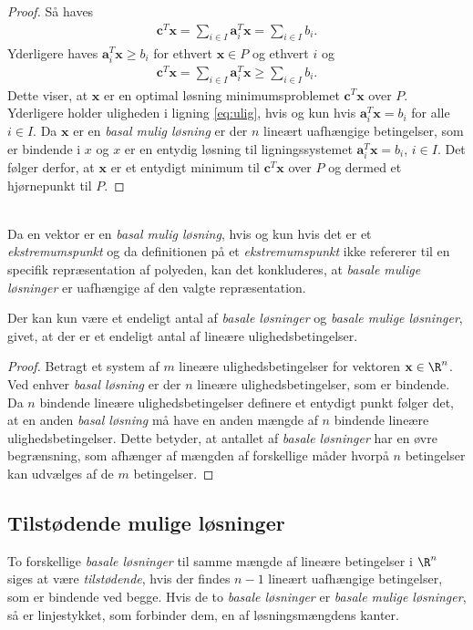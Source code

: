 \begin{proof}
Så haves
%
\begin{align*}
\textbf{c}^T\textbf{x} = \sum_{i\in I}\textbf{a}_i^T\textbf{x} = \sum_{i\in I}b_i.
\end{align*}
%
Yderligere haves $\textbf{a}_i^T\textbf{x} \geq b_i$ for ethvert $\textbf{x} \in P$ og ethvert $i$ og 
%
\begin{align}\label{eq:ulig}
\textbf{c}^T\textbf{x} = \sum_{i\in I}\textbf{a}_i^T\textbf{x} \geq \sum_{i\in I}b_i.
\end{align}
%
Dette viser, at $\textbf{x}$ er en optimal løsning minimumsproblemet $\textbf{c}^T\textbf{x}$ over $P$.
Yderligere holder uligheden i ligning \ref{eq:ulig}, hvis og kun hvis $\textbf{a}_i^T\textbf{x} = b_i$ for alle $i \in I$.
Da $\textbf{x}$ er en \textit{basal mulig løsning} er der $n$ lineært uafhængige betingelser, som er bindende i $x$ og $x$ er en entydig løsning til ligningssystemet $\textbf{a}_i^T\textbf{x} = b_i$, $i \in I$.
Det følger derfor, at $\textbf{x}$ er et entydigt minimum til $\textbf{c}^T\textbf{x}$ over $P$ og dermed et hjørnepunkt til $P$.
%
\end{proof}\\
%
Da en vektor er en \textit{basal mulig løsning}, hvis og kun hvis det er et \textit{ekstremumspunkt} og da definitionen på et \textit{ekstremumspunkt} ikke refererer til en specifik repræsentation af polyeden, kan det konkluderes, at \textit{basale mulige løsninger} er uafhængige af den valgte repræsentation.
%
\begin{kor}{}{}
Der kan kun være et endeligt antal af \textit{basale løsninger} og \textit{basale mulige løsninger}, givet, at der er et endeligt antal af lineære ulighedsbetingelser.
\end{kor}
%
\begin{proof}
Betragt et system af $m$ lineære ulighedsbetingelser for vektoren $\textbf{x} \in \R^n$.
Ved enhver \textit{basal løsning} er der $n$ lineære ulighedsbetingelser, som er bindende.
Da $n$ bindende lineære ulighedsbetingelser definere et entydigt punkt følger det, at en anden \textit{basal løsning} må have en anden mængde af $n$ bindende lineære ulighedsbetingelser.
Dette betyder, at antallet af \textit{basale løsninger} har en øvre begrænsning, som afhænger af mængden af forskellige måder hvorpå $n$ betingelser kan udvælges af de $m$ betingelser.
\end{proof}
%
\subsection{Tilstødende mulige løsninger}
%
To forskellige \textit{basale løsninger} til samme mængde af lineære betingelser i $\R^n$ siges at være \textit{tilstødende}, hvis der findes $n-1$ lineært uafhængige betingelser, som er bindende ved begge.
Hvis de to \textit{basale løsninger} er \textit{basale mulige løsninger}, så er linjestykket, som forbinder dem, en af løsningsmængdens kanter.